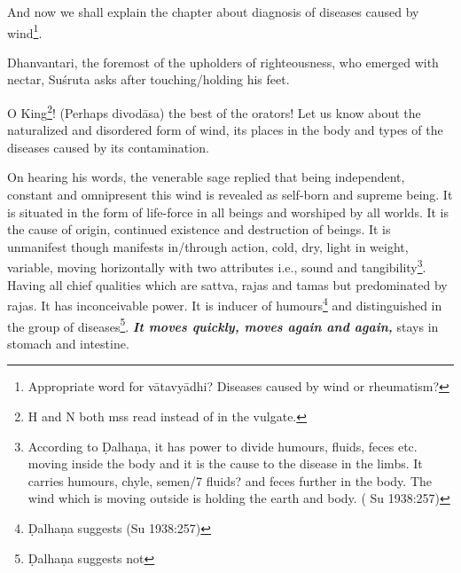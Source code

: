 \begin{translation}
    
\item [1] And now we shall explain the chapter about diagnosis of
diseases caused by wind\footnote{ Appropriate word for vātavyādhi?
    Diseases caused by wind or rheumatism?}.
    
\item[2]
    
\item[3] Dhanvantari, the foremost of the upholders of righteousness, who
emerged with nectar, Suśruta asks after touching/holding his
feet.
    
\item[4] O King\footnote{ H and N both mss read instead of
     in the vulgate.}! (Perhaps divodāsa) the best of the orators! Let us know about
    the naturalized and disordered form of wind, its places in the body and
    types of the diseases caused by its contamination.
        
\item[5--9ab] On hearing his words, the venerable sage replied that being
independent, constant and omnipresent this wind is revealed as self-born
and supreme being. It is situated in the form of life-force in all beings
and worshiped by all worlds. It is the cause of origin, continued
existence and destruction of beings. It is unmanifest though manifests
in/through action, cold, dry, light in weight, variable, moving
horizontally with two attributes i.e., sound and tangibility\footnote{
    According to Ḍalhaṇa, it has power to divide humours, fluids, feces etc.
    moving inside the body and it is the cause to the disease in the limbs.
    It carries humours, chyle, semen/7 fluids? and feces further in the body.
    The wind which is moving outside is holding the earth and body. (      Su
    1938:257)}. Having all chief qualities which are sattva, rajas and tamas
    but predominated by rajas. It has inconceivable power. It is inducer of
    humours\footnote{ Ḍalhaṇa suggests  (Su 1938:257)} and
        distinguished in the group of diseases\footnote{ Ḍalhaṇa suggests
             not  }. \emph{\textbf{It move}\textbf{s
                    quickly, moves again and again, }}stays in stomach and intestine.
                    

\end{translation}
